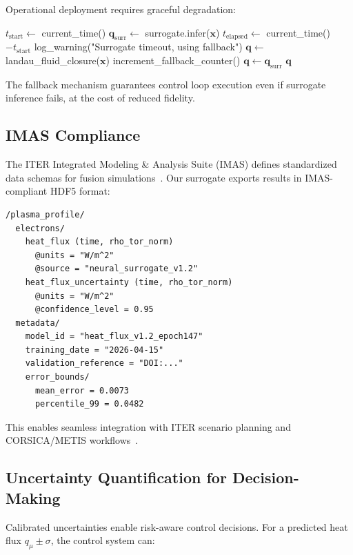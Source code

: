 \documentclass[12pt]{article}
\begin{document}
Operational deployment requires graceful degradation:

\begin{algorithm}[h]
\caption{Inference with Timeout Fallback}
\begin{algorithmic}[1]
\State $t_{\text{start}} \gets$ current\_time()
\State $\mathbf{q}_{\text{surr}} \gets$ surrogate.infer($\mathbf{x}$)
\State $t_{\text{elapsed}} \gets$ current\_time() $- t_{\text{start}}$
    \State log\_warning("Surrogate timeout, using fallback")
    \State $\mathbf{q} \gets$ landau\_fluid\_closure($\mathbf{x}$)
    \State increment\_fallback\_counter()
\Else
    \State $\mathbf{q} \gets \mathbf{q}_{\text{surr}}$
\EndIf
\State \Return $\mathbf{q}$
\end{algorithmic}
\end{algorithm}

The fallback mechanism guarantees control loop execution even if surrogate inference fails, at the cost of reduced fidelity.

\subsection{IMAS Compliance}

The ITER Integrated Modeling \& Analysis Suite (IMAS) defines standardized data schemas for fusion simulations~\cite{imbeaux2015}. Our surrogate exports results in IMAS-compliant HDF5 format:

\begin{verbatim}
/plasma_profile/
  electrons/
    heat_flux (time, rho_tor_norm)
      @units = "W/m^2"
      @source = "neural_surrogate_v1.2"
    heat_flux_uncertainty (time, rho_tor_norm)
      @units = "W/m^2"
      @confidence_level = 0.95
  metadata/
    model_id = "heat_flux_v1.2_epoch147"
    training_date = "2026-04-15"
    validation_reference = "DOI:..."
    error_bounds/
      mean_error = 0.0073
      percentile_99 = 0.0482
\end{verbatim}

This enables seamless integration with ITER scenario planning and CORSICA/METIS workflows~\cite{artaud2018}.

\subsection{Uncertainty Quantification for Decision-Making}

Calibrated uncertainties enable risk-aware control decisions. For a predicted heat flux $q_\mu \pm \sigma$, the control system can:
\end{document}
